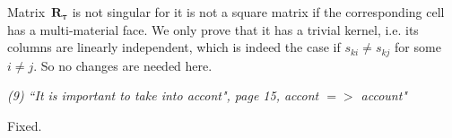 \documentclass[12pt]{article}
\begin{document}

Matrix~$\mathbf{R}_{\boldsymbol{\tau}}$ is not singular for it is not a square matrix if the corresponding cell has a multi-material face. We only prove that it has a trivial kernel, i.e. its columns are linearly independent, which is indeed the case if $s_{ki}\neq s_{kj}$ for some $i\neq j$. So no changes are needed here.

\emph{(9) ``It is important to take into accont", page 15, accont $=>$ account"}

Fixed.

%
%
%
\end{document}
